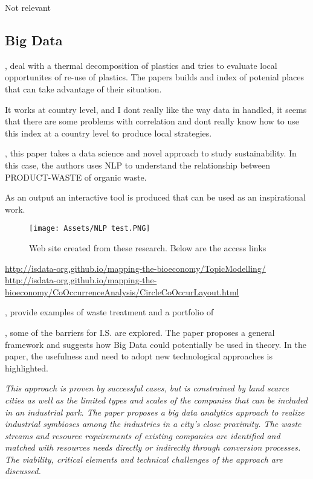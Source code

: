 Not relevant

\subsection{Big Data}
\textbf{}\par
\textcite{Joshi2019}, deal with a thermal decomposition of plastics and tries to evaluate local opportunites of re-use of plastics. The papers builds and index of potenial places that can take advantage of their situation. \par
It works at country level, and I dont really like the way data in handled, it seems that there are some problems with correlation and dont really know how to use this index at a country level to produce local strategies. \par

\textbf{}\par
\textcite{Davis2017}, this paper takes a data science and novel approach to study sustainability. In this case, the authors uses NLP to understand the relationship between PRODUCT-WASTE of organic waste. \par
As an output an interactive tool is produced that can be used as an inspirational work. 

\begin{figure}[h!]
    \centering
    \texttt{[image: Assets/NLP test.PNG]}
    \caption{Web site created from these research. Below are the access links}
    \label{fig:nlp}
\end{figure}

\url{http://isdata-org.github.io/mapping-the-bioeconomy/TopicModelling/}
\url{http://isdata-org.github.io/mapping-the-bioeconomy/CoOccurrenceAnalysis/CircleCoOccurLayout.html}


\textbf{}\par
\textcite{Migliore2020}, provide examples of waste treatment and a portfolio of

\textbf{}\par
\textcite{Bin2015}, some of the barriers for I.S. are explored. The paper proposes a general framework and suggests how Big Data could potentially be used in theory. In the paper, the usefulness and need to adopt new technological approaches is highlighted. 

\textit{This approach is proven by successful cases, but is constrained by land scarce cities as well as the limited types and scales of the companies that can be included in an industrial park. The paper proposes a big data analytics approach to realize industrial symbioses among the industries in a city's close proximity. The waste streams and resource requirements of existing companies are identified and matched with resources needs directly or indirectly through conversion processes. The viability, critical elements and technical challenges of the approach are discussed.}


